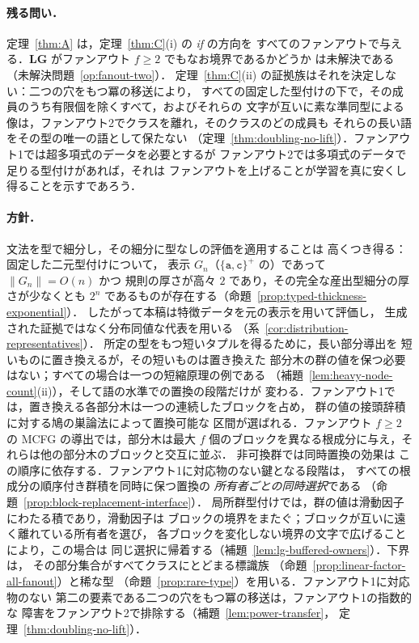 \paragraph{残る問い．}
定理~\ref{thm:A} は，定理~\ref{thm:C}(i) の \emph{if} の方向を
すべてのファンアウトで与える．$\mathbf{LG}$ がファンアウト $f\ge2$ でもなお境界であるかどうか
は未解決である（未解決問題~\ref{op:fanout-two}）．
定理~\ref{thm:C}(ii) の証拠族はそれを決定しない：二つの穴をもつ冪の移送により，
すべての固定した型付けの下で，その成員のうち有限個を除くすべて，およびそれらの
文字が互いに素な準同型による像は，ファンアウト2でクラスを離れ，そのクラスのどの成員も
それらの長い語をその型の唯一の語として保たない
（定理~\ref{thm:doubling-no-lift}）．ファンアウト1では超多項式のデータを必要とするが
ファンアウト2では多項式のデータで足りる型付けがあれば，それは
ファンアウトを上げることが学習を真に安くし得ることを示すであろう．

\paragraph{方針．}
文法を型で細分し，その細分に型なしの評価を適用することは
高くつき得る：固定した二元型付けについて，
表示 $G_n$（$\{\mathtt a,\mathtt c\}^+$ の）であって $\|G_n\|=O(n)$ かつ
規則の厚さが高々 $2$ であり，その完全な産出型細分の厚さが少なくとも
$2^n$ であるものが存在する（命題~\ref{prop:typed-thickness-exponential}）．
したがって本稿は特徴データを元の表示を用いて評価し，
生成された証拠ではなく分布同値な代表を用いる
（系~\ref{cor:distribution-representatives}）．
所定の型をもつ短いタプルを得るために，長い部分導出を
短いものに置き換えるが，その短いものは置き換えた
部分木の群の値を保つ必要はない；すべての場合は一つの短縮原理の例である
（補題~\ref{lem:heavy-node-count}(ii)），そして語の水準での置換の段階だけが
変わる．ファンアウト1では，置き換える各部分木は一つの連続したブロックを占め，
群の値の接頭辞積に対する鳩の巣論法によって置換可能な
区間が選ばれる．ファンアウト $f\ge2$ の MCFG の導出では，部分木は最大 $f$
個のブロックを異なる根成分に与え，それらは他の部分木のブロックと交互に並ぶ．
非可換群では同時置換の効果は
この順序に依存する．ファンアウト1に対応物のない鍵となる段階は，
すべての根成分の順序付き群積を同時に保つ置換の
\emph{所有者ごとの同時選択}である
（命題~\ref{prop:block-replacement-interface}）．
局所群型付けでは，群の値は滑動因子にわたる積であり，滑動因子は
ブロックの境界をまたぐ；ブロックが互いに遠く離れている所有者を選び，
各ブロックを変化しない境界の文字で広げることにより，この場合は
同じ選択に帰着する（補題~\ref{lem:lg-buffered-owners}）．下界は，
その部分集合がすべてクラスにとどまる標識族
（命題~\ref{prop:linear-factor-all-fanout}）と稀な型
（命題~\ref{prop:rare-type}）を用いる．ファンアウト1に対応物のない
第二の要素である二つの穴をもつ冪の移送は，ファンアウト1の指数的な
障害をファンアウト2で排除する（補題~\ref{lem:power-transfer}，
定理~\ref{thm:doubling-no-lift}）．

